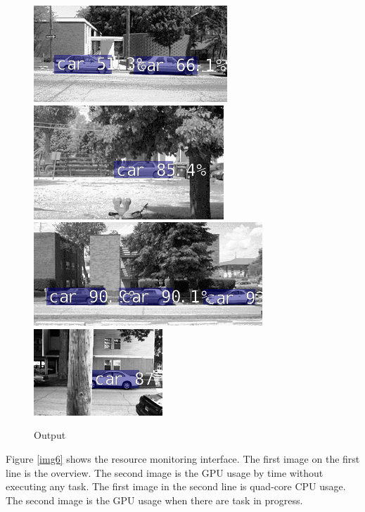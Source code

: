 \documentclass{article}
\begin{document}
        \begin{figure}[H]
            \centering
            \includegraphics[width=.4\textwidth]{img/output1.jpg}
            \includegraphics[width=.4\textwidth]{img/output2.jpg}
            \includegraphics[width=.4\textwidth]{img/output3.jpg}
            \includegraphics[width=.4\textwidth]{img/output4.jpg}
            \caption{Output}
            \label{img7}
        \end{figure}
        Figure \ref{img6} shows the resource monitoring interface. The first image on the first line is the overview. The second image is the GPU usage by time without executing any task. The first image in the second line is quad-core CPU usage. The second image is the GPU usage when there are task in progress.
\end{document}
